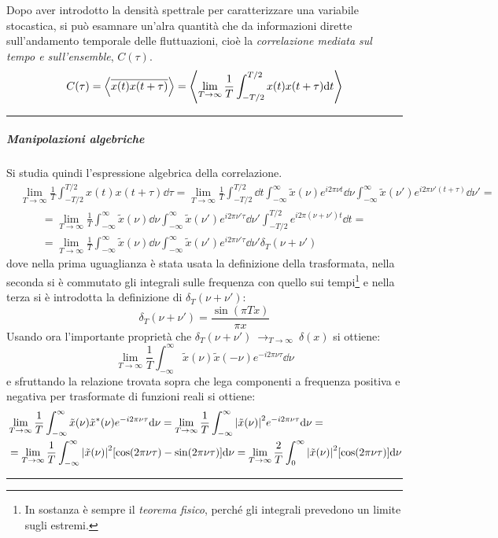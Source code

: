 Dopo aver introdotto la densità spettrale per caratterizzare una variabile stocastica, si può esamnare un'alra quantità che da informazioni dirette sull'andamento temporale delle fluttuazioni, cioè la \textit{correlazione mediata sul tempo e sull'ensemble}, $ C(\tau) $.\vspace*{-10pt}
\[ C(\tau) = \expval{\overline{x(t)x(t+\tau)}} = \expval{\lim\limits_{T \rightarrow \infty} \frac{1}{T} \int_{-T/2}^{T/2} x(t)x(t+\tau) \dd t} \]

\hrule
\subparagraph{Manipolazioni algebriche} Si studia quindi l'espressione algebrica della correlazione.
\begin{align*}
&\lim\limits_{T \rightarrow \infty} \frac{1}{T} \int_{-T/2}^{T/2} x(t)x(t+\tau) \dd \tau = \lim\limits_{T \rightarrow \infty} \frac{1}{T} \int_{-T/2}^{T/2} \dd t \int_{-\infty}^{\infty} \tilde{x}(\nu) e^{i 2\pi \nu t} \dd \nu \int_{-\infty}^{\infty} \tilde{x}(\nu') e^{i 2\pi \nu' (t + \tau)} \dd \nu'  =\\
&\qquad = \lim\limits_{T \rightarrow \infty} \frac{1}{T} \int_{-\infty}^{\infty} \tilde{x}(\nu) \dd \nu \int_{-\infty}^{\infty} \tilde{x}(\nu') e^{i 2\pi \nu' \tau} \dd \nu' \int_{-T/2}^{T/2} e ^{i 2\pi (\nu + \nu') t}  \dd t  =\\
&\qquad = \lim\limits_{T \rightarrow \infty} \frac{1}{T} \int_{-\infty}^{\infty} \tilde{x}(\nu) \dd \nu \int_{-\infty}^{\infty} \tilde{x}(\nu') e^{i 2\pi \nu' \tau} \dd \nu' \delta_T(\nu + \nu')
\end{align*}
dove nella prima uguaglianza è stata usata la definizione della trasformata, nella seconda si è commutato gli integrali sulle frequenza con quello sui tempi\footnote{In sostanza è sempre il \textit{teorema fisico}, perché gli integrali prevedono un limite sugli estremi.} e nella terza si è introdotta la definizione di $ \delta_T(\nu + \nu') $:
\[ \delta_T(\nu + \nu') = \frac{\sin(\pi T x)}{\pi x} \]
Usando ora l'importante proprietà che $ \delta_T(\nu + \nu') ~\rightarrow_{T \rightarrow \infty}~ \delta(x) $ si ottiene:
\[ \lim\limits_{T \rightarrow \infty} \frac{1}{T} \int_{-\infty}^{\infty} \tilde{x}(\nu) \tilde{x}(- \nu) e^{- i 2\pi \nu \tau} \dd \nu \]
e sfruttando la relazione trovata sopra che lega componenti a frequenza positiva e negativa per trasformate di funzioni reali si ottiene:
\begin{align*}
&\lim\limits_{T \rightarrow \infty} \frac{1}{T} \int_{-\infty}^{\infty} \tilde{x}(\nu) \tilde{x}^\ast(\nu) e^{- i 2\pi \nu \tau} \dd \nu = \lim\limits_{T \rightarrow \infty} \frac{1}{T} \int_{-\infty}^{\infty} \abs{\tilde{x}(\nu)}^2 e^{- i 2\pi \nu \tau} \dd \nu =\\
&=  \lim\limits_{T \rightarrow \infty} \frac{1}{T} \int_{-\infty}^{\infty} \abs{\tilde{x}(\nu)}^2 [\cos( 2\pi \nu  \tau) - \sin( 2\pi \nu \tau)] \dd \nu 
= \lim\limits_{T \rightarrow \infty} \frac{2}{T} \int_{0}^{\infty} \abs{\tilde{x}(\nu)}^2 [\cos( 2\pi \nu \tau)] \dd \nu  
\end{align*}
\hrule\vspace*{12pt}

